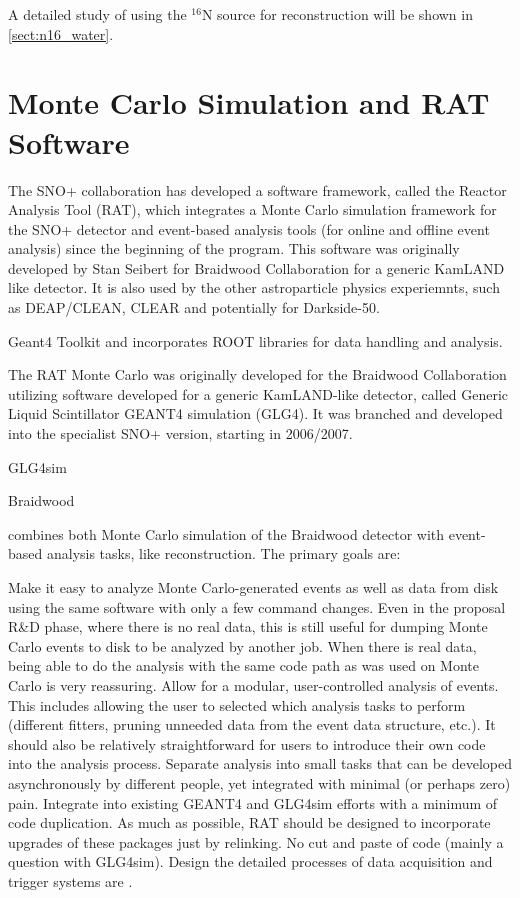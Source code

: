
A detailed study of using the $^{16}$N source for reconstruction will be shown in \ref{sect:n16_water}.



\section{Monte Carlo Simulation and RAT Software}\label{sect:rat}
The SNO+ collaboration has developed a software framework, called the Reactor Analysis
Tool (RAT), which integrates a Monte Carlo simulation framework for the SNO+ detector and event-based analysis tools (for online and offline event analysis) since the beginning of the program. This software was originally developed by Stan Seibert for Braidwood Collaboration for a generic KamLAND like detector. It is also used by the other astroparticle physics experiemnts, such as DEAP/CLEAN, CLEAR and potentially for Darkside-50\cite{rat}.

Geant4 Toolkit and
incorporates ROOT libraries for data handling and analysis.

The RAT Monte Carlo was originally developed for the Braidwood Collaboration
utilizing software developed for a generic KamLAND-like detector, called Generic Liquid Scintillator GEANT4 simulation (GLG4). It was branched and
developed into the specialist SNO+ version, starting in 2006/2007.

GLG4sim


Braidwood

combines both Monte Carlo simulation of the Braidwood detector with event-based analysis tasks, like reconstruction. The primary goals are:

Make it easy to analyze Monte Carlo-generated events as well as data from disk using the same software with only a few command changes. Even in the proposal R\&D phase, where there is no real data, this is still useful for dumping Monte Carlo events to disk to be analyzed by another job. When there is real data, being able to do the analysis with the same code path as was used on Monte Carlo is very reassuring.
Allow for a modular, user-controlled analysis of events. This includes allowing the user to selected which analysis tasks to perform (different fitters, pruning unneeded data from the event data structure, etc.). It should also be relatively straightforward for users to introduce their own code into the analysis process.
Separate analysis into small tasks that can be developed asynchronously by different people, yet integrated with minimal (or perhaps zero) pain.
Integrate into existing GEANT4 and GLG4sim efforts with a minimum of code duplication. As much as possible, RAT should be designed to incorporate upgrades of these packages just by relinking. No cut and paste of code (mainly a question with GLG4sim).
Design the detailed processes of data acquisition and trigger systems are \cite{whitepaper}.

